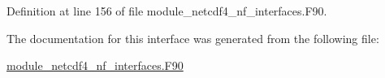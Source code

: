 Definition at line 156 of file module\+\_\+netcdf4\+\_\+nf\+\_\+interfaces.\+F90.



The documentation for this interface was generated from the following file\+:\begin{DoxyCompactItemize}
\item 
\hyperlink{module__netcdf4__nf__interfaces_8F90}{module\+\_\+netcdf4\+\_\+nf\+\_\+interfaces.\+F90}\end{DoxyCompactItemize}
